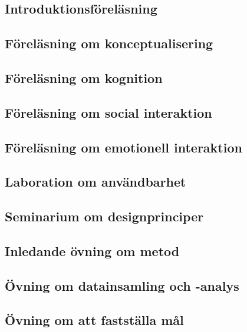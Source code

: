 \documentclass[a4paper,logo]{miunart}
\begin{document}
\subsection{Introduktionsföreläsning}


\subsection{Föreläsning om konceptualisering}


\subsection{Föreläsning om kognition}


\subsection{Föreläsning om social interaktion}


\subsection{Föreläsning om emotionell interaktion}


\subsection{Laboration om användbarhet}


\subsection{Seminarium om designprinciper}


\subsection{Inledande övning om metod}


\subsection{Övning om datainsamling och -analys}


\subsection{Övning om att fastställa mål}

\end{document}
